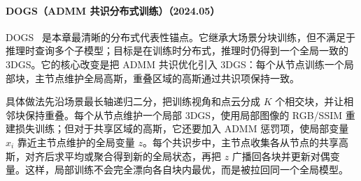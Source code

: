 \paragraph{DOGS（ADMM 共识分布式训练）（2024.05）}
DOGS~\cite{2405_13943} 是本章最清晰的分布式代表性锚点。它继承大场景分块训练，但不满足于推理时查询多个子模型；目标是在训练时分布式，推理时仍得到一个全局一致的 3DGS。它的核心改变是把 ADMM 共识优化引入 3DGS：每个从节点训练一个局部块，主节点维护全局高斯，重叠区域的高斯通过共识项保持一致。

具体做法先沿场景最长轴递归二分，把训练视角和点云分成 $K$ 个相交块，并让相邻块保持重叠。每个从节点维护一个局部 3DGS，使用局部图像的 RGB/SSIM 重建损失训练；但对于共享区域的高斯，它还要加入 ADMM 惩罚项，使局部变量 $x_i$ 靠近主节点维护的全局变量 $z$。每个共识步中，主节点收集各从节点的共享高斯，对齐后求平均或聚合得到新的全局状态，再把 $z$ 广播回各块并更新对偶变量。这样，局部训练不会完全漂向各自块内最优，而是被拉回同一个全局模型。

